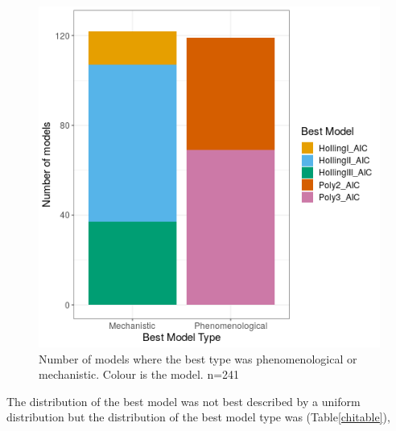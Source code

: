 \documentclass{article}
\begin{document}
\begin{figure}[h] %
    \centering
    \includegraphics[width=5in]{../Results/Plots/modelbesttype}
    \caption{Number of models where the best type was phenomenological or mechanistic. Colour is the model. n=241}
    \label{fig:modelbesttype}
\end{figure}



The distribution of the best model was not best described by a uniform distribution but the distribution of the best model type was  (Table\ref{chitable}),

%
\end{document}
